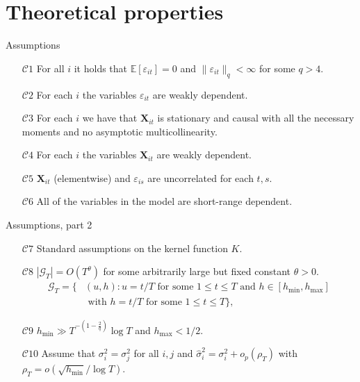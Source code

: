 \documentclass[10pt]{beamer}
\newcommand{\E}{\mathbb{E}}
\newcommand{\X}{\boldsymbol{X}}
\begin{document}
\section{Theoretical properties}




\begin{frame}[label = frame_assumptions]{Assumptions}
\begin{itemize}

\item[$\mathcal{C}1$] \label{C-err1} For all $i$ it holds that $\E[\varepsilon_{it}] =0$ and $\| \varepsilon_{it} \|_q < \infty$ for some $q > 4$.\pause
\item[$\mathcal{C}2$] For each $i$ the variables $\varepsilon_{it}$ are weakly dependent. \hyperlink{tech_assumptions}{}\pause

\item[$\mathcal{C}3$] \label{C-reg} For each $i$ we have that $\X_{it}$ is stationary and causal with all the necessary moments and no asymptotic multicollinearity.\pause

\item[$\mathcal{C}4$] For each $i$ the variables $\X_{it}$ are weakly dependent. \hyperlink{tech_assumptions_2}{}\pause
\item[$\mathcal{C}5$]  $\X_{it}$ (elementwise) and $\varepsilon_{is}$ are uncorrelated for each $t, s$.\pause

\item[$\mathcal{C}6$] All of the variables in the model are short-range dependent.\hyperlink{tech_assumptions_3}{}

\end{itemize}
\end{frame}

\begin{frame}{Assumptions, part 2}
\begin{itemize}
\item[$\mathcal{C}7$]\label{C-ker} Standard assumptions on the kernel function $K$. \pause
\item[$\mathcal{C}8$] \label{C-grid} $|\mathcal{G}_T| = O(T^\theta)$ for some arbitrarily large but fixed constant $\theta > 0$.\pause
\begin{align*}
\mathcal{G}_T = \big\{ & (u,h): u = t/T \text{ for some } 1 \le t \le T \text{ and } h \in [h_{\min},h_{\max}] \\ & \text{ with } h = t/T \text{ for some } 1 \le t \le T  \big\},
\end{align*}\pause
\vspace{-5mm}
\item[$\mathcal{C}9$] \label{C-h} $h_{\min} \gg T^{-(1-\frac{2}{q})} \log T$ and $h_{\max} <1/2$.\pause
\item[$\mathcal{C}10$] Assume that $\sigma_i^2 = \sigma_j^2$ for all $i, j$ and $\widehat{\sigma}_i^2 = \sigma_i^2 + o_p(\rho_T)$ with $\rho_T = o(\sqrt{h_{\min}}/\log T)$.
\end{itemize}
\end{frame}
\end{document}
